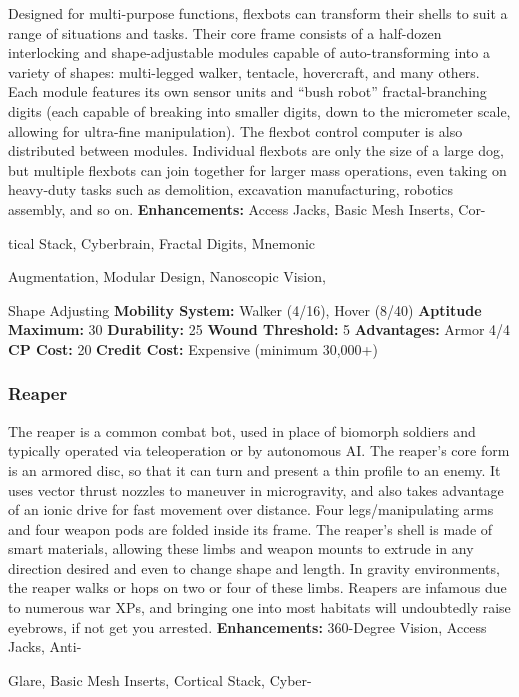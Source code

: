Designed for multi-purpose functions, flexbots  can 
transform their shells to suit a range of situations 
and tasks. Their core frame consists of a half-dozen 
interlocking and shape-adjustable modules capable of 
auto-transforming into a variety of shapes: multi-legged 
walker, tentacle, hovercraft, and many others. Each 
module features its own sensor units and ``bush robot'' 
fractal-branching digits (each capable of breaking into 
smaller digits, down to the micrometer scale, allowing 
for ultra-fine manipulation). The flexbot control computer
is also distributed between modules. Individual
flexbots are only the size of a large dog, but multiple 
flexbots can join together for larger mass operations, 
even taking on heavy-duty tasks such as demolition, excavation
manufacturing, robotics assembly, and so on.
\textbf{Enhancements:} Access Jacks, Basic Mesh Inserts, Cor-

tical Stack, Cyberbrain, Fractal Digits, Mnemonic 

Augmentation, Modular Design, Nanoscopic Vision, 

Shape Adjusting
\textbf{Mobility System:} Walker (4/16), Hover (8/40)
\textbf{Aptitude Maximum: }30
\textbf{Durability:} 25
\textbf{Wound Threshold:} 5
\textbf{Advantages:} Armor 4/4
\textbf{CP Cost:} 20
\textbf{Credit Cost: }Expensive (minimum 30,000+)

\subsubsection{Reaper}

The reaper is a common combat bot, used in place of 
biomorph soldiers and typically operated via teleoperation
or by autonomous AI. The reaper's core form
is an armored disc, so that it can turn and present a 
thin profile to an enemy. It uses vector thrust nozzles 
to maneuver in microgravity, and also takes advantage
of an ionic drive for fast movement over distance.
Four legs/manipulating arms and four weapon pods 
are folded inside its frame. The reaper's shell is made 
of smart materials, allowing these limbs and weapon 
mounts to extrude in any direction desired and even 
to change shape and length. In gravity environments, 
the reaper walks or hops on two or four of these limbs. 
Reapers are infamous due to numerous war XPs, and 
bringing one into most habitats will undoubtedly raise 
eyebrows, if not get you arrested.
\textbf{Enhancements:} 360-Degree Vision, Access Jacks, Anti-

Glare, Basic Mesh Inserts, Cortical Stack, Cyber-

